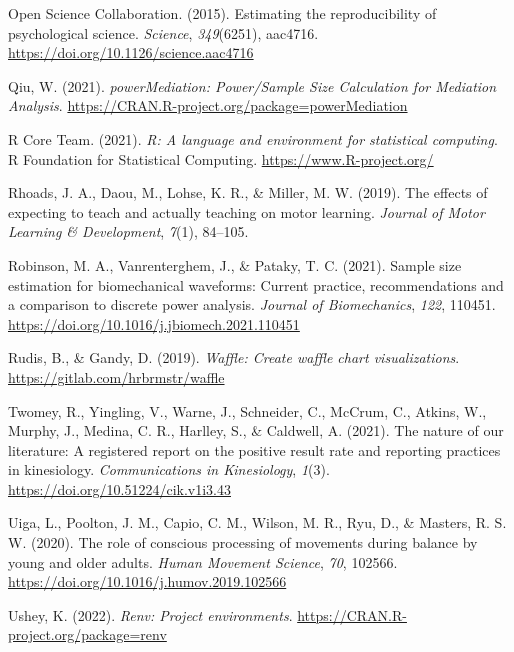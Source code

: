 \documentclass[
  man, donotrepeattitle,mask,floatsintext]{apa7}
\newlength{\cslhangindent}
\newlength{\cslentryspacingunit} %
\newenvironment{CSLReferences}[2] %
 {%
  \setlength{\parindent}{0pt}
  \ifodd #1
  \let\oldpar\par
  \def\par{\hangindent=\cslhangindent\oldpar}
  \fi
  \setlength{\parskip}{#2\cslentryspacingunit}
 }%
 {}
\begin{document}
\begin{CSLReferences}{1}{0}
\leavevmode{}%
Open Science Collaboration. (2015). Estimating the reproducibility of psychological science. \emph{Science}, \emph{349}(6251), aac4716. \url{https://doi.org/10.1126/science.aac4716}

\leavevmode{}%
Qiu, W. (2021). \emph{{powerMediation}: {Power}/{Sample} {Size} {Calculation} for {Mediation} {Analysis}}. \url{https://CRAN.R-project.org/package=powerMediation}

\leavevmode{}%
R Core Team. (2021). \emph{R: A language and environment for statistical computing}. R Foundation for Statistical Computing. \url{https://www.R-project.org/}

\leavevmode{}%
Rhoads, J. A., Daou, M., Lohse, K. R., \& Miller, M. W. (2019). The effects of expecting to teach and actually teaching on motor learning. \emph{Journal of Motor Learning \& Development}, \emph{7}(1), 84--105.

\leavevmode{}%
Robinson, M. A., Vanrenterghem, J., \& Pataky, T. C. (2021). Sample size estimation for biomechanical waveforms: Current practice, recommendations and a comparison to discrete power analysis. \emph{Journal of Biomechanics}, \emph{122}, 110451. \url{https://doi.org/10.1016/j.jbiomech.2021.110451}

\leavevmode{}%
Rudis, B., \& Gandy, D. (2019). \emph{Waffle: Create waffle chart visualizations}. \url{https://gitlab.com/hrbrmstr/waffle}

\leavevmode{}%
Twomey, R., Yingling, V., Warne, J., Schneider, C., McCrum, C., Atkins, W., Murphy, J., Medina, C. R., Harlley, S., \& Caldwell, A. (2021). The nature of our literature: A registered report on the positive result rate and reporting practices in kinesiology. \emph{Communications in Kinesiology}, \emph{1}(3). \url{https://doi.org/10.51224/cik.v1i3.43}

\leavevmode{}%
Uiga, L., Poolton, J. M., Capio, C. M., Wilson, M. R., Ryu, D., \& Masters, R. S. W. (2020). The role of conscious processing of movements during balance by young and older adults. \emph{Human Movement Science}, \emph{70}, 102566. \url{https://doi.org/10.1016/j.humov.2019.102566}

\leavevmode{}%
Ushey, K. (2022). \emph{Renv: Project environments}. \url{https://CRAN.R-project.org/package=renv}


\end{CSLReferences}
\end{document}
